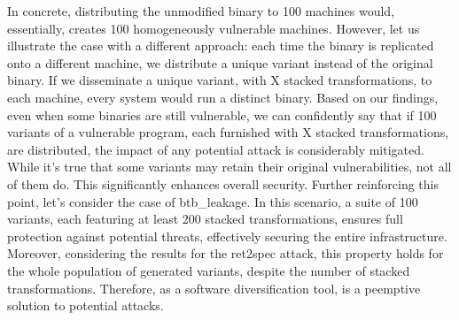 In concrete, distributing the unmodified binary to 100 machines would, essentially, creates 100 homogeneously vulnerable machines.
However, let us illustrate the case with a different approach: each time the binary is replicated onto a different machine, we distribute a unique variant instead of the original binary. 
If we disseminate a unique variant, with X stacked transformations, to each machine, every system would run a distinct \wasm binary. 
Based on our findings, even when some binaries are still vulnerable, we can confidently say that if 100 variants of a vulnerable program, each furnished with X stacked transformations, are distributed, the impact of any potential attack is considerably mitigated.
While it's true that some variants may retain their original vulnerabilities, not all of them do. 
This significantly enhances overall security. 
Further reinforcing this point, let's consider the case of btb\_leakage. 
In this scenario, a suite of 100 variants, each featuring at least 200 stacked transformations, ensures full protection against potential threats, effectively securing the entire infrastructure.
Moreover, considering the results for the ret2spec attack, this property holds for the whole population of generated variants, despite the number of stacked transformations.
Therefore, \tool as a software diversification tool, is a peemptive solution to potential attacks.
